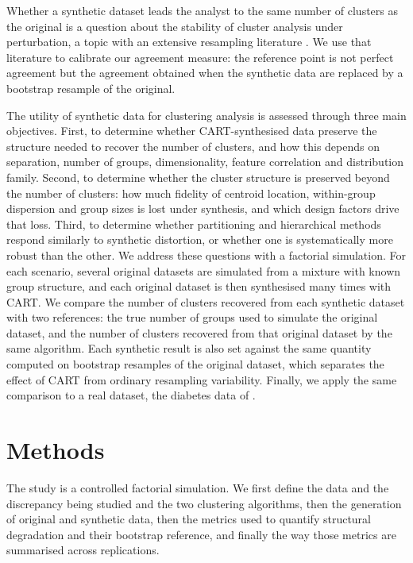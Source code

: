 \documentclass[pdflatex,referee]{sn-jnl}
\begin{document}
Whether a synthetic dataset leads the analyst to the same number of clusters
as the original is a question about the stability of cluster analysis under
perturbation, a topic with an extensive resampling literature
\citep{benhur2002,dudoit2002,tibshirani2005,hennig2007,luxburg2010}. We use
that literature to calibrate our agreement measure: the reference point is not
perfect agreement but the agreement obtained when the synthetic data are
replaced by a bootstrap resample of the original.

The utility of synthetic data for clustering analysis is assessed through three
main objectives. First, to determine whether CART-synthesised data preserve the
structure needed to recover the number of clusters, and how this depends on
separation, number of groups, dimensionality, feature correlation and
distribution family. Second, to determine whether the cluster structure is
preserved beyond the number of clusters: how much fidelity of centroid
location, within-group dispersion and group sizes is lost under synthesis, and
which design factors drive that loss. Third, to determine whether partitioning
and hierarchical methods respond similarly to synthetic distortion, or whether
one is systematically more robust than the other. We address these questions
with a factorial simulation. For each scenario, several original datasets are
simulated from a mixture with known group structure, and each original dataset
is then synthesised many times with CART. We compare the number of clusters
recovered from each synthetic dataset with two references: the true number of
groups used to simulate the original dataset, and the number of clusters
recovered from that original dataset by the same algorithm. Each synthetic
result is also set against the same quantity computed on bootstrap resamples
of the original dataset, which separates the effect of CART from ordinary
resampling variability. Finally, we apply the same comparison to a real
dataset, the diabetes data of \citet{reaven1979}.

\section{Methods}

The study is a controlled factorial simulation. We first define the data and
the discrepancy being studied and the two clustering algorithms, then the
generation of original and synthetic data, then the metrics used to quantify
structural degradation and their bootstrap reference, and finally the way
those metrics are summarised across replications.
\end{document}
